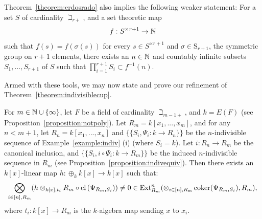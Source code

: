 \begin{remark}\label{remark:boxuseful}
Theorem~\ref{theorem:erdosrado} also implies the following weaker statement: For a set $S$ of cardinality $\beth_{r+}$, and a set theoretic map
\[f: S^{\times r+1} \rightarrow \mathbb{N}\]
such that $f(s) = f(\sigma(s))$ for every $s \in S^{\times r+1}$ and $\sigma \in \mathrm{S}_{r+1}$, the symmetric group on $r+1$ elements, there exists an $n \in \mathbb{N}$ and countably infinite subsets $S_1, ..., S_{r+1}$ of $S$ such that $ \prod_{i=1}^{r+1} S_i \subset f^{-1}(n)$.
\end{remark}
Armed with these tools, we may now state and prove our refinement of Theorem~\ref{theorem:indivisiblecup}.
\begin{theorem}\label{theorem:countermod}
For $m \in \mathbb{N} \cup \{\infty\}$, let $F$ be a field of cardinality $\beth_{m-1+}$, and $k=E(F)$ (see Proposition~\ref{proposition:notpoly}). 
Let $R_m=k[x_1,...,x_m]$, and for any $n < m+1$, let $R_n=k[x_1,...,x_n]$ and $\{\{S_i,\Psi_{i}: k \to R_n\}\}$ be the $n$-indivisible sequence 
of Example~\ref{example:indiv} (i) (where $S_i=k$). Let $i:R_n \to R_m$ be the canonical inclusion, and $\{\{S_i,i \circ \Psi_{i}: k \to R_m\}\}$ be 
the induced $n$-indivisible sequence in $R_m$ (see Proposition~\ref{proposition:indivequiv}).
Then there exists an $k[x]$-linear map $h: \oplus_{k} k[x] \to k[x]$ such that:
\[\bigotimes_{i\in [n], R_m} (h \otimes_{k[x], t_i} R_m \circ \mathrm{cl}\left(\Psi_{R_m,S_i}\right)) \neq 0 \in \operatorname{Ext}^n_{R_m}(\otimes_{i\in [n], R_m} \operatorname{coker}(\Psi_{R_m,S_i}), R_m),\]
where $t_i: k[x] \to R_m$ is the $k$-algebra map sending $x$ to $x_i$.
\end{theorem}
